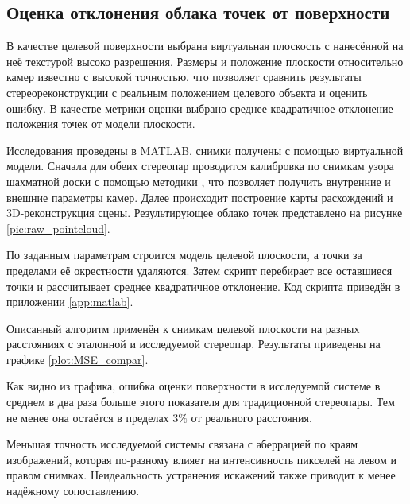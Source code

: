 



\subsection{Оценка отклонения облака точек от поверхности}  %

В качестве целевой поверхности выбрана виртуальная плоскость с нанесённой на неё текстурой высоко разрешения. Размеры и
положение плоскости относительно камер известно с высокой точностью, что позволяет сравнить результаты стереореконструкции
с реальным положением целевого объекта и оценить ошибку. В качестве метрики оценки выбрано среднее квадратичное отклонение
положения точек от модели плоскости. 

Исследования проведены в MATLAB, снимки получены с помощью виртуальной модели. Сначала для обеих стереопар проводится
калибровка по снимкам узора шахматной доски с помощью методики \cite{stereo_calib}, что позволяет получить 
внутренние и внешние параметры камер. %
Далее происходит построение карты расхождений \cite{SGBM} и 3D-реконструкция сцены. Результирующее облако точек 
представлено на рисунке
\ref{pic:raw_pointcloud}.

По заданным параметрам строится модель целевой плоскости, а точки за пределами её окрестности удаляются. %
Затем скрипт перебирает все оставшиеся точки и рассчитывает среднее квадратичное отклонение. Код скрипта приведён
 в приложении \ref{app:matlab}.

Описанный алгоритм применён к снимкам целевой плоскости на разных расстояниях с эталонной и исследуемой стереопар.
Результаты приведены на графике \ref{plot:MSE_compar}.


Как видно из графика, ошибка оценки поверхности в исследуемой системе в среднем в два раза больше этого показателя для
традиционной стереопары. Тем не менее она остаётся в пределах $3\%$ от реального расстояния.  %

Меньшая точность исследуемой системы связана с аберрацией по краям изображений, которая по-разному влияет на интенсивность 
пикселей на левом и правом снимках. Неидеальность устранения искажений также приводит к менее надёжному сопоставлению. 

